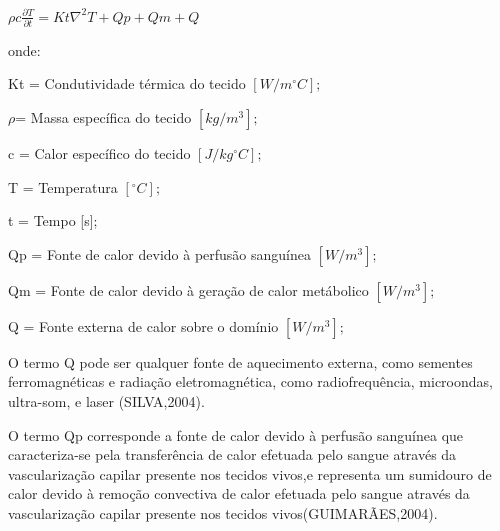 $   \rho c$$\frac{\partial T}{\partial t} = Kt\nabla^{2}
   T+ Qp + Qm + Q $

  onde:

 Kt = Condutividade térmica do tecido $[W/m^{\circ}C];$

  $\rho $= Massa específica do tecido $[kg/m^3];$

 c = Calor específico do tecido $[J/kg^{\circ}C];$

  T = Temperatura $[^{\circ}C];$

  t = Tempo [s];

   Qp = Fonte de calor devido à perfusão sanguínea $[W/m^3];$


   Qm = Fonte de calor devido à geração de calor metábolico $[W/m^3];$

  Q = Fonte externa de calor sobre o domínio $[W/m^3];$

 O termo Q pode ser qualquer fonte de aquecimento externa, como sementes ferromagnéticas e radiação eletromagnética, como radiofrequência, microondas, ultra-som, e laser (SILVA,2004). %

       O termo Qp corresponde a fonte de calor devido à perfusão sanguínea que caracteriza-se pela transferência de calor efetuada pelo sangue através da vascularização capilar presente nos tecidos vivos,e representa um sumidouro de calor devido à remoção convectiva de calor efetuada pelo sangue através da vascularização capilar presente nos tecidos vivos(GUIMARÃES,2004).%


